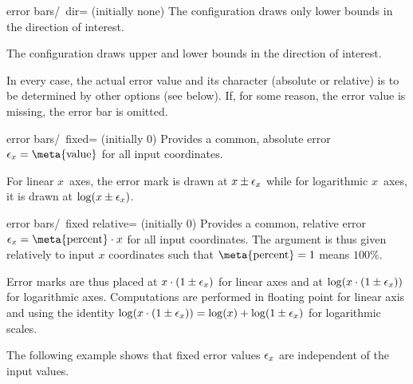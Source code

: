 {\begin{pgfplotsxykey}{error bars/\x\ dir= (initially none)}
	The configuration  draws only lower bounds in the direction of interest.

	The configuration  draws upper and lower bounds in the direction of interest.

	In every case, the actual error value and its character (absolute or relative) is to be determined by other options (see below). If, for some reason, the error value is missing, the error bar is omitted.

\end{pgfplotsxykey}




\begin{pgfplotsxykey}{error bars/\x\ fixed= (initially 0)}
	Provides a common, absolute error $\pgfplotserror x=\text{\meta{value}}$ for all input coordinates.

\begin{codeexample}[]
\end{codeexample}

	For linear $x$~axes, the error mark is drawn at $x \pm \epsilon_{x}$ while for logarithmic $x$~axes, it is drawn at $\log( x \pm \epsilon_{x})$.
\end{pgfplotsxykey}

\begin{pgfplotsxykey}{error bars/\x\ fixed relative= (initially 0)}
Provides a common, relative error $\pgfplotserror x = \text{\meta{percent}} \cdot x$ for all input coordinates. The argument  is thus given relatively to input $x$ coordinates such that $\text{\meta{percent}} = 1$ means $100\%$.

Error marks are thus placed at $x \cdot (1 \pm \epsilon_{x})$ for linear axes and at $\log(x \cdot (1 \pm \epsilon_{x}))$ for logarithmic axes. Computations are performed in floating point for linear axis and using the identity $\log(x \cdot (1 \pm \epsilon_{x})) = \log(x) + \log( 1 \pm \epsilon_{x})$ for logarithmic scales.

The following example shows that fixed error values $\epsilon_{x}$ are independent of the input values.


\end{pgfplotsxykey}}
